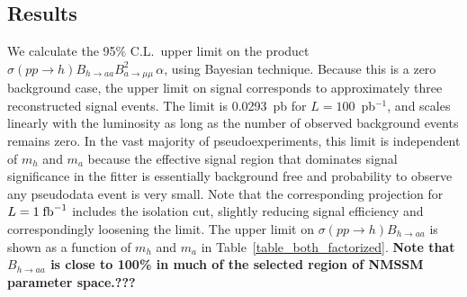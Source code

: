 \documentclass[aps,prl,nofootinbib,superscriptaddress]{revtex4}
\begin{document}
\subsection{Results}
We calculate the 95\% C.L.\ upper limit on the product $\sigma(pp \to h) B_{h \to aa} B^2_{a \to \mu \mu} \, \alpha$, 
using Bayesian technique. Because this is a zero background case, the upper limit on signal corresponds to approximately 
three reconstructed signal events. The limit is 0.0293~pb for $L = 100$~pb$^{-1}$, and scales linearly with the luminosity
as long as the number of observed background events remains zero. In the vast majority of pseudoexperiments, this limit 
is independent of $m_h$ and $m_a$ because the effective signal region that dominates signal significance in the fitter 
is essentially background free and probability to observe any pseudodata event is very small. Note that the corresponding 
projection for $L=1\; \mbox{${\rm fb}^{-1}$}$ includes the isolation cut, slightly reducing signal efficiency and correspondingly loosening
the limit. The upper limit on $\sigma(pp \to h) B_{h \to aa}$ is shown as a function of $m_h$ and $m_a$ in Table~\ref{table_both_factorized}.  
{\bf Note that $B_{h \to aa}$ is close to 100\% in much of the selected region of NMSSM parameter space.???}
\end{document}
